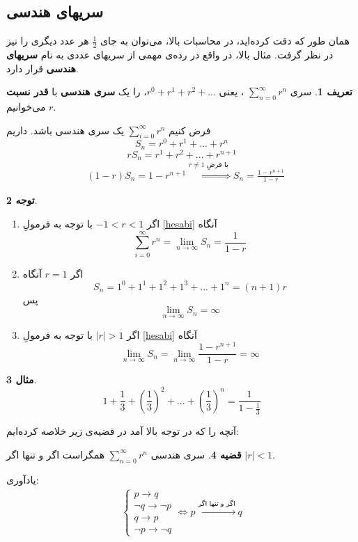 \documentclass[12pt,a4paper]{article}
\theoremstyle{definition}
\newtheorem{thm}{قضیه}
\newtheorem{mesal}[thm]{مثال}
\newtheorem{tav}[thm]{توجه}
\newtheorem{defn}[thm]{تعریف}
\begin{document}
\subsection*{سریهای هندسی}
همان طور که دقت کرده‌اید، در محاسبات بالا، می‌توان به جای
$\frac{1}{2}$
هر عدد دیگری را نیز در نظر گرفت. 
مثال بالا، در واقع در رده‌ی مهمی از سریهای عددی به نام 
\textbf{سریهای هندسی}
قرار دارد. 
\begin{defn}
سری 
$\sum_{n=0}^{\infty}r^n$
، یعنی
$r^0+r^1+r^2+...$،
را یک 
\textbf{سری هندسی}
با
\textbf{قدر نسبت $r$}
می‌خوانیم.
\end{defn}
فرض کنیم
$\sum_{i=0}^\infty r^n$
یک سری هندسی باشد. داریم
\[
S_n = r^0+r^1+...+r^n
\]
\[
rS_n = r^1+r^2+...+r^{n+1}
\]
\begin{align}
\label{hesabi}
&
(1-r)S_n =1-r^{n+1}\stackrel{r\not=1\text{ با فرضِ }}\Rightarrow S_n=\frac{1-r^{n+1}}{{1-r}}
\end{align}
\begin{tav}
\begin{enumerate}
\item
اگر 
$-1<r<1$
با توجه به فرمولِ 
\ref{hesabi}
آنگاه
\[
\sum_{i=0}^\infty r^n=\lim_{n \to \infty}S_n=\frac{1}{1-r}
\]
\item
اگر 
$r=1$
آنگاه 
\[
S_n=1^0+1^1+1^2+1^3+...+1^n=(n+1)r
\]
پس
\[
\lim_{n \to \infty} S_n=\infty
\]
\item
اگر 
$|r|>1$
با توجه به فرمولِ 
\ref{hesabi}
آنگاه
\[
\lim_{n \to \infty}S_n=\lim_{n \to \infty}\frac{1-r^{n+1}}{1-r}=\infty
\]
\end{enumerate}
\end{tav}
\begin{mesal}
\[
1+\frac{1}{3}+(\frac{1}{3})^2+...+(\frac{1}{3})^n = \frac{1}{1-\frac{1}{3}}
\]
\end{mesal}
آنچه را که در توجه بالا آمد  در قضیه‌ی زیر خلاصه کرده‌ایم:
\begin{thm}
سری هندسی 
$\sum_{n=0}^{\infty}r^n$
همگراست اگر و تنها اگر 
$|r|<1$.
\end{thm}
\begin{framed}
یادآوری:
\begin{align*}
\begin{cases}
p \to q
\\
\neg q \to \neg p
\\
q \to p
\\
\neg p \to \neg q
\end{cases}
\Leftrightarrow
p  \stackrel{\text{اگر و تنها اگر}}{\longleftrightarrow} q
\end{align*}
\end{framed}
\end{document}
